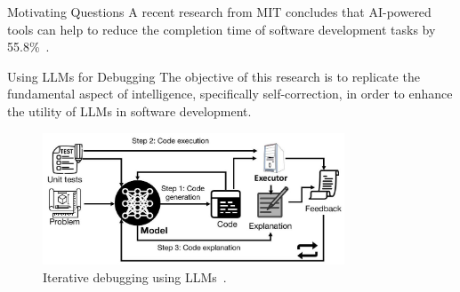 \begin{frame}{Motivating Questions}
    \fontsize{14.4}{1}\selectfont A recent research from MIT concludes that AI-powered tools can help to reduce the completion time of software development tasks by 55.8\%~\cite{peng2023impact}.\\
    \vspace{1cm}
\end{frame}

\begin{frame}{Using LLMs for Debugging}
    The objective of this research is to replicate the fundamental aspect of intelligence, specifically self-correction, in order to enhance the utility of LLMs in software development.\\
    \vspace{0.5cm}
    \begin{figure}[!htb]
        \centering
        \includegraphics[width=0.8\textwidth]{img/self_debug}
        \captionsetup{font=small,labelformat=empty}
        \caption{Iterative debugging using LLMs~\cite{chen2023teaching}.}\label{fig:self_debug}
    \end{figure}
\end{frame}
